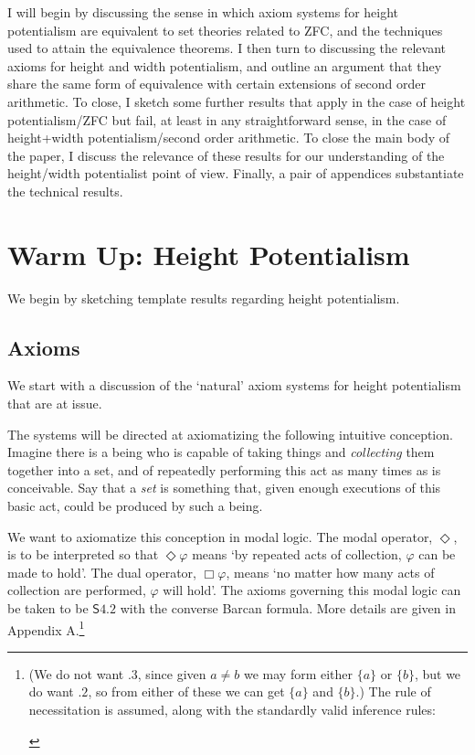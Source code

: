\documentclass{article}
\begin{document}
I will begin by discussing the sense in which axiom systems for height potentialism
are equivalent to set theories related to ZFC, and the techniques used to attain 
the equivalence theorems. I then turn to discussing the relevant axioms 
for height and width 
potentialism, and outline an argument that they share the same form of equivalence with certain extensions 
of second order arithmetic. To close, I sketch some further results that apply in the 
case of height potentialism/ZFC but fail, at least in any straightforward sense, 
in the case of height+width potentialism/second order arithmetic. 
To close the main body of the paper, I discuss the relevance of these results for our understanding 
of the height/width potentialist point of view.
Finally, a pair of appendices substantiate the technical results.
\section{Warm Up: Height Potentialism}
We begin by sketching template results regarding height potentialism. 
\subsection{Axioms}
We start with a discussion of the `natural' axiom systems for height potentialism 
that are at issue.

The systems will be directed at axiomatizing the following 
intuitive conception. Imagine there is a being who is capable of taking things 
and \emph{ collecting} them together into a set, and of repeatedly performing this act 
as many times as is conceivable. Say that a \emph{set} is something that, given enough 
executions of this basic act, could be produced by such a being. 

We want to axiomatize this conception in modal logic. The modal operator, $\Diamond$, 
is to be interpreted so that $\Diamond \varphi$ means
`by repeated acts of collection, $\varphi$ can be made to hold'. The dual 
operator, $\Box \varphi$, means `no matter how many acts of collection are performed, 
$\varphi$ will hold'. The axioms governing this modal logic can be taken to be 
$\mathsf{S4.2}$ with the converse Barcan formula. More details are given in Appendix A.\footnote{(We do not want $.3$, 
since given $a \not= b$ we may form either $\{a\}$ or $\{b\}$, but we do want 
$.2$,
so from either of these we can get $\{a\}$ and $\{b\}$.) The rule of necessitation 
is assumed, along with the standardly valid inference rules:
\begin{prooftree}
\end{prooftree}}
 
\end{document}
